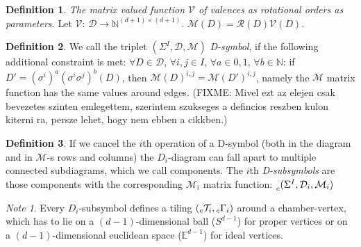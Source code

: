 \documentclass[12pt,a4paper]{article}
\newcommand{\leftsub}[2]{{\vphantom{#2}}_{#1}{#2}}
\theoremstyle{plain}%
\theoremstyle{definition}
\newtheorem{defn}{Definition}[section]
\theoremstyle{remark}
\newtheorem*{note}{Note}
\begin{document}
\begin{defn}
  {\em The matrix valued function $\mathcal{V}$ of valences as rotational orders
  as parameters.}
  Let $\mathcal{V}$: $\mathcal{D} \rightarrow \mathbb{N}^{(d+1)\times (d+1)}$.
  $\mathcal{M}(D)=\mathcal{R}(D)\mathcal{V}(D)$.
\end{defn}

\begin{defn}
  We call the triplet $(\Sigma^I,\mathcal{D},\mathcal{M})$ {\em D-symbol}, if the
  following additional constraint is met:
  $\forall D\in \mathcal{D}$, $\forall i,j\in I$, $\forall a\in {0,1}$,
      $\forall b\in \mathbb{N}$: if $D'=(\sigma^i)^a(\sigma^i\sigma^j)^b(D)$,
      then $\mathcal{M}(D)^{i,j}=\mathcal{M}(D')^{i,j}$, namely the
      $\mathcal{M}$ matrix function has the same values around edges. (FIXME:
      Mivel ezt az elejen csak bevezetes szinten emlegettem, szerintem szukseges
      a defincios reszben kulon kiterni ra, persze lehet, hogy nem ebben a
      cikkben.)
\end{defn}


\begin{defn}
  If we cancel the $i$th operation of a D-symbol (both in the diagram and in
  $\mathcal{M}$-s rows and columns) the $D_i$-diagram can fall apart to multiple
  connected subdiagrams, which we call components. The $i$th {\em D-subsymbols} are
  those components with the corresponding $\mathcal{M}_i$ matrix function:
  $\leftsub{c}{(\Sigma^I,\mathcal{D}_i,\mathcal{M}_i)}$
\end{defn}

\begin{note}
  Every $D_i$-subsymbol defines a tiling
  $(\leftsub{c}{\mathcal{T}}_i,\leftsub{c}{\Gamma}_i)$ around a chamber-vertex, which has to lie
  on a $(d-1)$-dimensional ball ($S^{d-1}$) for proper vertices or on a $(d-1)$-dimensional
  euclidean space ($\mathbb{E}^{d-1}$) for ideal vertices.
\end{note}
\end{document}
